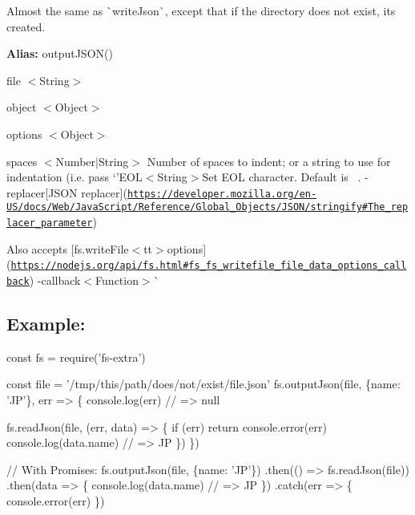 Almost the same as \`{}write\+Json\`{}, except that if the directory does not exist, it\textquotesingle{}s created.

{\bfseries Alias\+:} {\ttfamily output\+J\+S\+O\+N()}


\begin{DoxyItemize}
\item {\ttfamily file} {\ttfamily $<$String$>$}
\item {\ttfamily object} {\ttfamily $<$Object$>$}
\item {\ttfamily options} {\ttfamily $<$Object$>$}
\begin{DoxyItemize}
\item {\ttfamily spaces} {\ttfamily $<$Number$\vert$\+String$>$} Number of spaces to indent; or a string to use for indentation (i.\+e. pass `'E\+O\+L$<$\+String$>${\ttfamily Set E\+OL character. Default is}~\newline
{\ttfamily . -\/}replacer{\ttfamily \mbox{[}J\+S\+ON replacer\mbox{]}(\href{https://developer.mozilla.org/en-US/docs/Web/JavaScript/Reference/Global_Objects/JSON/stringify#The_replacer_parameter}{\tt https\+://developer.\+mozilla.\+org/en-\/\+U\+S/docs/\+Web/\+Java\+Script/\+Reference/\+Global\+\_\+\+Objects/\+J\+S\+O\+N/stringify\#\+The\+\_\+replacer\+\_\+parameter})}
\item {\ttfamily Also accepts \mbox{[}}fs.\+write\+File$<$tt$>$options\mbox{]}(\href{https://nodejs.org/api/fs.html#fs_fs_writefile_file_data_options_callback}{\tt https\+://nodejs.\+org/api/fs.\+html\#fs\+\_\+fs\+\_\+writefile\+\_\+file\+\_\+data\+\_\+options\+\_\+callback}) -\/callback$<$\+Function$>$\`{}
\end{DoxyItemize}
\end{DoxyItemize}

\subsection*{Example\+:}


\begin{DoxyCode}
const fs = require('fs-extra')

const file = '/tmp/this/path/does/not/exist/file.json'
fs.outputJson(file, \{name: 'JP'\}, err => \{
  console.log(err) // => null

  fs.readJson(file, (err, data) => \{
    if (err) return console.error(err)
    console.log(data.name) // => JP
  \})
\})

// With Promises:
fs.outputJson(file, \{name: 'JP'\})
.then(() => fs.readJson(file))
.then(data => \{
  console.log(data.name) // => JP
\})
.catch(err => \{
  console.error(err)
\})
\end{DoxyCode}
 